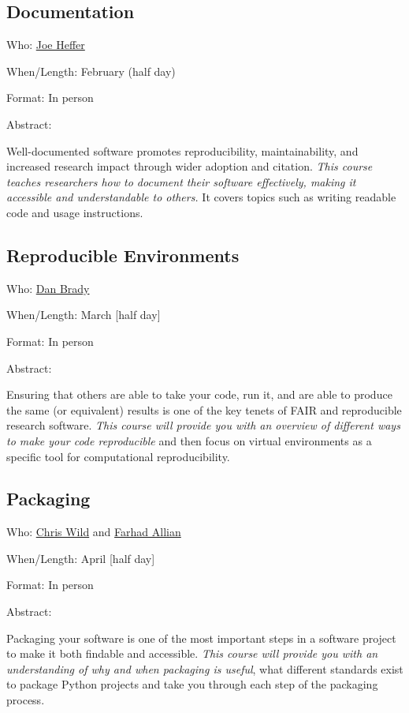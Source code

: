 \documentclass[
  letterpaper,
  DIV=11,
  numbers=noendperiod]{scrartcl}
\begin{document}
\subsection{Documentation}\label{documentation}

{Who}: \href{mailto:joe.heffer@sheffield.ac.uk}{Joe Heffer}

{When/Length}: February (half day)

{Format}: In person

Abstract:

Well-documented software promotes reproducibility, maintainability, and
increased research impact through wider adoption and citation.
{\emph{This course teaches researchers how to document their software
effectively, making it accessible and understandable to others.}} It
covers topics such as writing readable code and usage instructions.

\subsection{Reproducible Environments}\label{reproducible-environments}

{Who}: \href{mailto:dan.brady@sheffield.ac.uk}{Dan Brady}

{When/Length}: March {[}half day{]}

{Format}: In person

Abstract:

Ensuring that others are able to take your code, run it, and are able to
produce the same (or equivalent) results is one of the key tenets of
FAIR and reproducible research software. {\emph{This course will provide
you with an overview of different ways to make your code reproducible}}
and then focus on virtual environments as a specific tool for
computational reproducibility.

\subsection{Packaging}\label{packaging}

{Who}: \href{}{Chris Wild} and \href{}{Farhad Allian}

{When/Length}: April {[}half day{]}

{Format}: In person

Abstract:

Packaging your software is one of the most important steps in a software
project to make it both findable and accessible. {\emph{This course will
provide you with an understanding of why and when packaging is useful}},
what different standards exist to package Python projects and take you
through each step of the packaging process.
\end{document}
